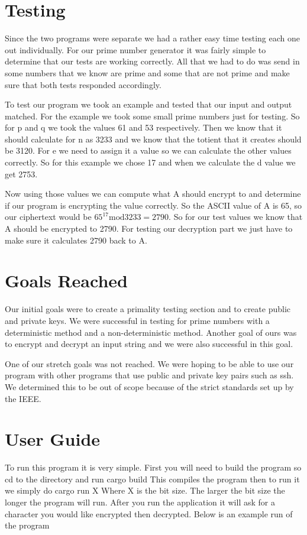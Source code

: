 \documentclass[12pt,technote]{IEEEtran}
\begin{document}
\section{Testing}
Since the two programs were separate we had a rather easy time testing each one 
out individually. 
For our prime number generator it was fairly simple to determine that our tests 
are working correctly. All that we had to do was send in some numbers that we 
know are prime and some that are not prime and make sure that both tests 
responded accordingly. 
\par To test our program we took an example and tested that our input and output 
matched. For the example we took some small prime numbers just for testing. So 
for p and q we took the values 61 and 53 respectively. Then we know that it 
should calculate for n as 3233 and we know that the totient that it creates 
should be 3120. For e we need to assign it a value so we can calculate the other 
values correctly. So for this example we chose 17 and when we calculate the d 
value we get 2753. 
\par Now using those values we can compute what A should encrypt to and 
determine if our program is encrypting the value correctly. So the ASCII value 
of A is 65, so our ciphertext would be ${65}^{17}\mathrm{mod}3233=2790$. So for 
our test values we know that A should be encrypted to 2790. For testing our 
decryption part we just have to make sure it calculates 2790 back to A.

\section{Goals Reached}
Our initial goals were to create a primality testing section and to create 
public and private keys. We were successful in testing for prime numbers with a 
deterministic method and a non-deterministic method. Another goal of ours was to 
encrypt and decrypt an input string and we were also successful in this goal. 
\par One of our stretch goals was not reached. We were hoping to be able to use 
our program with other programs that use public and private key pairs such as 
ssh. We determined this to be out of scope because of the strict standards set 
up by the IEEE. 

\section{User Guide}
To run this program it is very simple. First you will need to build the program 
so cd to the directory and run 
cargo build
This compiles the program then to run it we simply do 
cargo run X 
Where X is the bit size. The larger the bit size the longer the program will 
run. After you run the application it will ask for a character you would like 
encrypted then decrypted. Below is an example run of the program\newline
\end{document}
